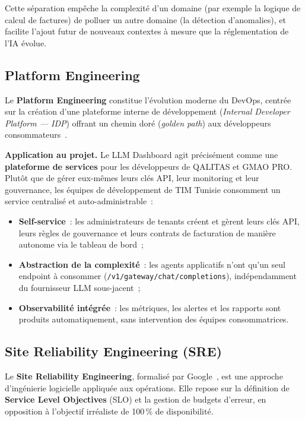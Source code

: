Cette séparation empêche la complexité d'un domaine (par exemple la logique de calcul de factures) de polluer un autre domaine (la détection d'anomalies), et facilite l'ajout futur de nouveaux contextes à mesure que la réglementation de l'IA évolue.

\subsection{Platform Engineering}

Le \textbf{Platform Engineering} constitue l'évolution moderne du DevOps, centrée sur la création d'une \og plateforme interne de développement \fg{} (\textit{Internal Developer Platform --- IDP}) offrant un \og chemin doré \fg{} (\textit{golden path}) aux développeurs consommateurs~\cite{ford2017}.

\textbf{Application au projet.} Le LLM Dashboard agit précisément comme une \textbf{plateforme de services} pour les développeurs de QALITAS et GMAO PRO. Plutôt que de gérer eux-mêmes leurs clés API, leur monitoring et leur gouvernance, les équipes de développement de TIM Tunisie consomment un service centralisé et auto-administrable~:

\begin{itemize}[noitemsep]
    \item \textbf{Self-service}~: les administrateurs de tenants créent et gèrent leurs clés API, leurs règles de gouvernance et leurs contrats de facturation de manière autonome via le tableau de bord~;
    \item \textbf{Abstraction de la complexité}~: les agents applicatifs n'ont qu'un seul endpoint à consommer (\texttt{/v1/gateway/chat/completions}), indépendamment du fournisseur LLM sous-jacent~;
    \item \textbf{Observabilité intégrée}~: les métriques, les alertes et les rapports sont produits automatiquement, sans intervention des équipes consommatrices.
\end{itemize}


\subsection{Site Reliability Engineering (SRE)}

Le \textbf{Site Reliability Engineering}, formalisé par Google~\cite{beyer2016}, est une approche d'ingénierie logicielle appliquée aux opérations. Elle repose sur la définition de \textbf{Service Level Objectives} (SLO) et la gestion de budgets d'erreur, en opposition à l'objectif irréaliste de 100\,\% de disponibilité.

